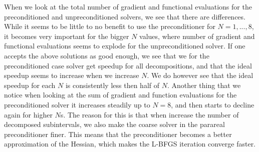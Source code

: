 When we look at the total number of gradient and functional evaluations for the preconditioned and unpreconditioned solvers, we see that there are differences. While it seems to be little to no benefit to use the preconditioner for $N=1,...,8$, it becomes very important for the bigger $N$ values, where number of gradient and functional evaluations seems to explode for the unpreconditioned solver. If one accepts the above solutions as good enough, we see that we for the preconditioned case solver get speedup for all decompositions, and that the ideal speedup seems to increase when we increase $N$. We do however see that the ideal speedup for each $N$ is consistently less then half of $N$. Another thing that we notice when looking at the sum of gradient and function evaluations for the preconditioned solver it increases steadily up to $N=8$, and then starts to decline again for higher $N$s. The reason for this is that when increase the number of decomposed subintervals, we also make the coarse solver in the parareal preconditioner finer. This means that the preconditioner becomes a better approximation of the Hessian, which makes the L-BFGS iteration converge faster. 
